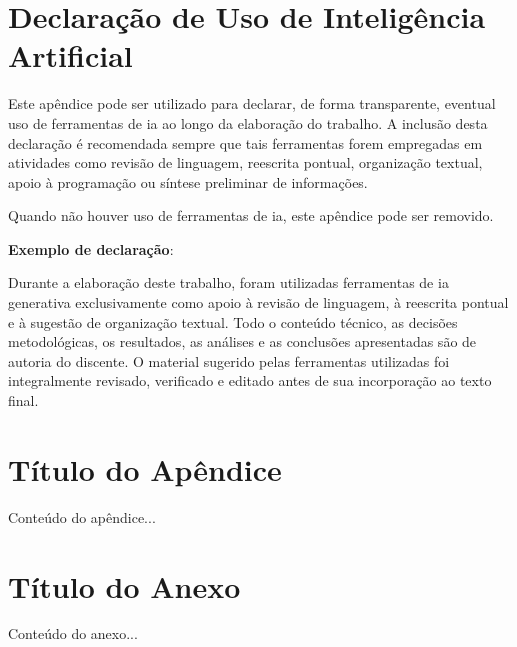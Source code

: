 \documentclass{eic-bcc-tcc}
\begin{document}
\backmatter


\appendix
\chapter{Declaração de Uso de Inteligência Artificial}

Este apêndice pode ser utilizado para declarar, de forma transparente, eventual uso de ferramentas de \gls{ia} ao longo da elaboração do trabalho. A inclusão desta declaração é recomendada sempre que tais ferramentas forem empregadas em atividades como revisão de linguagem, reescrita pontual, organização textual, apoio à programação ou síntese preliminar de informações.

Quando não houver uso de ferramentas de \gls{ia}, este apêndice pode ser removido.

\textbf{Exemplo de declaração}:

Durante a elaboração deste trabalho, foram utilizadas ferramentas de \gls{ia} generativa exclusivamente como apoio à revisão de linguagem, à reescrita pontual e à sugestão de organização textual. Todo o conteúdo técnico, as decisões metodológicas, os resultados, as análises e as conclusões apresentadas são de autoria do discente. O material sugerido pelas ferramentas utilizadas foi integralmente revisado, verificado e editado antes de sua incorporação ao texto final.

\chapter{Título do Apêndice}
Conteúdo do apêndice...

\anexos
\chapter{Título do Anexo}
Conteúdo do anexo...
\end{document}
